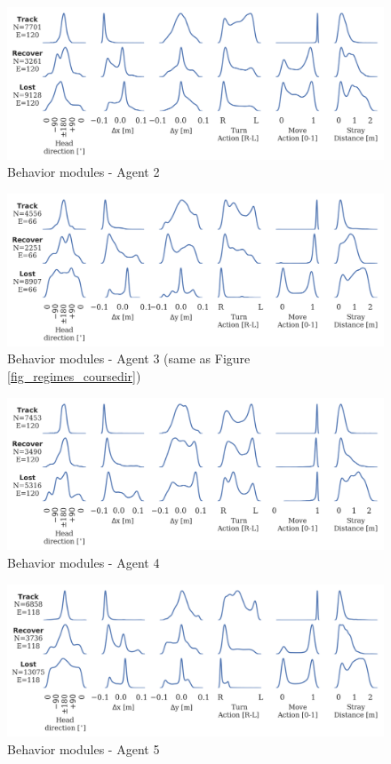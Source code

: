 \documentclass[5p,twocolumn,authoryear]{elsarticle}
\begin{document}
\begin{figure}[h!]
\centering
\includegraphics[width=0.85\linewidth]{regime_histos_3199993.png}
\caption[Behavior modules - Agent 2]{Behavior modules - Agent 2}
\end{figure}

\begin{figure}[h!]
\centering
\includegraphics[width=0.85\linewidth]{regime_histos_3307e9.png}
\caption[Behavior modules - Agent 3]{Behavior modules - Agent 3 (same as Figure \ref{fig_regimes_coursedir})}
\end{figure}

\begin{figure}[h!]
\centering
\includegraphics[width=0.85\linewidth]{regime_histos_541058.png}
\caption[Behavior modules - Agent 4]{Behavior modules - Agent 4}
\end{figure}

\begin{figure}[h!]
\centering
\includegraphics[width=0.85\linewidth]{regime_histos_9781ba.png}
\caption[Behavior modules - Agent 5]{Behavior modules - Agent 5}
\end{figure}
\end{document}
